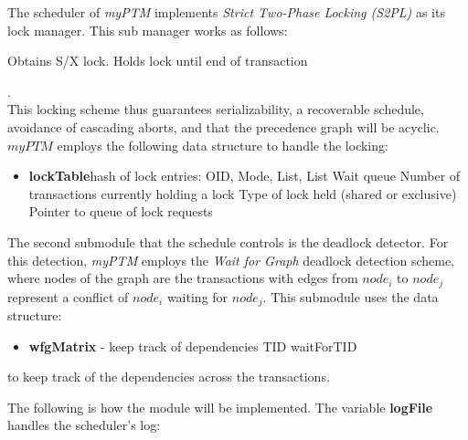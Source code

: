 The scheduler of \textit{myPTM} implements \textit{Strict Two-Phase Locking (S2PL)} as its lock manager. This sub manager works as follows:

\begin{algorithmic}

	\State Obtains S/X lock.
	\State Holds lock until end of transaction 
	\EndIf
   
\end{algorithmic}  . \\

This locking scheme thus guarantees serializability, a recoverable schedule, avoidance of cascading aborts, and that the precedence graph will be acyclic. $myPTM$ employs the following data structure to handle the locking:

\begin{itemize}
\item \textbf{lockTable}hash of lock entries: OID, Mode, List, List Wait queue
\subitem Number of transactions currently holding a lock
\subitem Type of lock held (shared or exclusive)
\subitem Pointer to queue of lock requests
\end{itemize}

The second submodule that the schedule controls is the deadlock detector. For this detection, \textit{myPTM} employs the \textit{Wait for Graph} deadlock detection scheme, where nodes of the graph are the transactions with edges from $node_i$ to $node_j$ represent a conflict of $node_i$ waiting for $node_j$. This submodule uses the data structure:

\begin{itemize}
\item \textbf{wfgMatrix} - keep track of dependencies 
\subitem TID
\subitem waitForTID
\end{itemize}

to keep track of the dependencies across the transactions. 

The following is how the module will be implemented. The variable \textbf{logFile} handles the scheduler's log: \\

